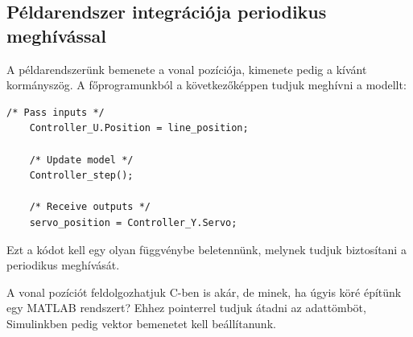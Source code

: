 \subsection{Példarendszer integrációja periodikus meghívással}

A példarendszerünk bemenete a vonal pozíciója, kimenete pedig a kívánt kormányszög. A főprogramunkból a következőképpen tudjuk meghívni a modellt:

\begin{lstlisting}[frame=single]
	/* Pass inputs */
	Controller_U.Position = line_position;

	/* Update model */
	Controller_step();

	/* Receive outputs */
	servo_position = Controller_Y.Servo;
\end{lstlisting}

Ezt a kódot kell egy olyan függvénybe beletennünk, melynek tudjuk biztosítani a periodikus meghívását.

A vonal pozíciót feldolgozhatjuk C-ben is akár, de minek, ha úgyis köré építünk egy MATLAB rendszert? Ehhez pointerrel tudjuk átadni az adattömböt, Simulinkben pedig vektor bemenetet kell beállítanunk.